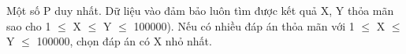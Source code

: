 Một số P duy nhất. Dữ liệu vào đảm bảo luôn tìm được kết quả X, Y thỏa mãn sao cho 1  $\le$  X  $\le$  Y  $\le$  100000). Nếu có nhiều đáp án thỏa mãn với 1  $\le$  X  $\le$  Y  $\le$  100000, chọn đáp án có X nhỏ nhất.